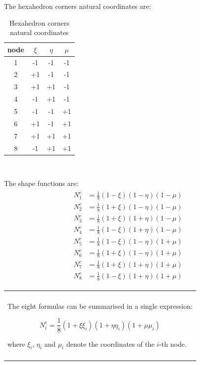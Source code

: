 \documentclass[10pt,b5paper,titlepage]{book}
\newenvironment{bbox}[1][0.96]
{
    \begin{center}
        \begin{tabular}{|p{#1\textwidth}|}
            \hline\\
}
{
            \\\\\hline
        \end{tabular}
    \end{center}
}
\newenvironment{eqarray}
{
    \begin{eqnarray}
        \begin{aligned}
}
{
        \end{aligned}
    \end{eqnarray}
}
\begin{document}
The hexahedron corners natural coordinates are:

\begin{table}[ht]
    \centering
    \begin{tabular}{|c c c c|}
        \hline
        node & $\xi$ & $\eta$ & $\mu$\\
        \hline
        1 & -1 & -1 & -1\\
        2 & +1 & -1 & -1\\
        3 & +1 & +1 & -1\\
        4 & -1 & +1 & -1\\
        5 & -1 & -1 & +1\\
        6 & +1 & -1 & +1\\
        7 & +1 & +1 & +1\\
        8 & -1 & +1 & +1\\
        \hline
    \end{tabular}\\
    \caption{Hexahedron corners natural coordinates}
\end{table}

The shape functions are:
\begin{eqarray}
    N_1^e &= \frac{1}{8} \left(1-\xi\right) \left(1-\eta\right) \left(1-\mu\right)\\
    N_2^e &= \frac{1}{8} \left(1+\xi\right) \left(1-\eta\right) \left(1-\mu\right)\\
    N_3^e &= \frac{1}{8} \left(1+\xi\right) \left(1+\eta\right) \left(1-\mu\right)\\
    N_4^e &= \frac{1}{8} \left(1-\xi\right) \left(1+\eta\right) \left(1-\mu\right)\\
    N_5^e &= \frac{1}{8} \left(1-\xi\right) \left(1-\eta\right) \left(1+\mu\right)\\
    N_6^e &= \frac{1}{8} \left(1+\xi\right) \left(1-\eta\right) \left(1+\mu\right)\\
    N_7^e &= \frac{1}{8} \left(1+\xi\right) \left(1+\eta\right) \left(1+\mu\right)\\
    N_8^e &= \frac{1}{8} \left(1-\xi\right) \left(1+\eta\right) \left(1+\mu\right)
\end{eqarray}

\begin{bbox}[0.96]
    The eight formulas can be summarised in a single expression:

    \begin{equation}
        N_i^e = \frac{1}{8}
              \left(1+\xi\xi_i\right)
              \left(1+\eta\eta_i\right)
              \left(1+\mu\mu_i\right)
    \end{equation}

    where $\xi_i$, $\eta_i$ and $\mu_i$ denote the coordinates of the $i$-th node.
\end{bbox}
\end{document}

